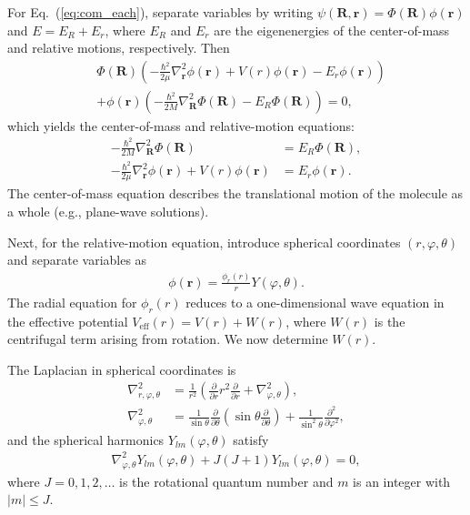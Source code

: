 For Eq.~(\ref{eq:com_each}), separate variables by writing $\psi(\boldsymbol{R},\boldsymbol{r}) = \Phi(\boldsymbol{R}) \phi(\boldsymbol{r})$ and $E = E_R + E_r$, where $E_R$ and $E_r$ are the eigenenergies of the center-of-mass and relative motions, respectively. Then
\begin{align}
&\Phi(\boldsymbol{R}) \left( - \frac{\hbar^2}{2 \mu} \nabla_{\boldsymbol{r}}^2 \phi(\boldsymbol{r})  + V(r) \phi(\boldsymbol{r}) - E_r \phi(\boldsymbol{r})  \right) \nonumber \\
&+ \phi(\boldsymbol{r}) \left(  - \frac{\hbar^2}{2 M} \nabla_{\boldsymbol{R}}^2 \Phi(\boldsymbol{R}) - E_R \Phi(\boldsymbol{R}) \right) = 0,
\end{align}
which yields the center-of-mass and relative-motion equations:
\begin{align}
- \frac{\hbar^2}{2 M} \nabla_{\boldsymbol{R}}^2 \Phi(\boldsymbol{R}) &= E_R \Phi(\boldsymbol{R}), \\
- \frac{\hbar^2}{2 \mu} \nabla_{\boldsymbol{r}}^2 \phi(\boldsymbol{r})  + V(r) \phi(\boldsymbol{r}) &= E_r \phi(\boldsymbol{r}).
\end{align}
The center-of-mass equation describes the translational motion of the molecule as a whole (e.g., plane-wave solutions).

Next, for the relative-motion equation, introduce spherical coordinates $(r,\varphi,\theta)$ and separate variables as
\begin{eqnarray}
\label{eq:rotvib}
\phi(\boldsymbol{r}) = \frac{\phi_r(r)}{r} Y(\varphi, \theta).
\end{eqnarray}
The radial equation for $\phi_r(r)$ reduces to a one-dimensional wave equation in the effective potential $V_\mathrm{eff}(r) = V(r) + W(r)$, where $W(r)$ is the centrifugal term arising from rotation. We now determine $W(r)$.

The Laplacian in spherical coordinates is
\begin{align}
\nabla^2_{r, \varphi, \theta} &= \frac{1}{r^2} \left( \frac{\partial}{\partial r} r^2 \frac{\partial}{\partial r} + \nabla^2_{\varphi, \theta} \right), \\
\nabla^2_{\varphi, \theta} &= \frac{1}{\sin{\theta}}\frac{\partial}{\partial \theta}
\left( \sin{\theta} \frac{\partial}{\partial \theta} \right)
+ \frac{1}{\sin^2 \theta} \frac{\partial^2}{\partial \varphi^2},
\end{align}
and the spherical harmonics $Y_{lm}(\varphi,\theta)$ satisfy
\begin{eqnarray}
\nabla^2_{\varphi, \theta} Y_{lm}(\varphi, \theta) + J(J+1) Y_{lm}(\varphi, \theta) = 0,
\end{eqnarray}
where $J=0,1,2,\dots$ is the rotational quantum number and $m$ is an integer with $|m| \le J$.

